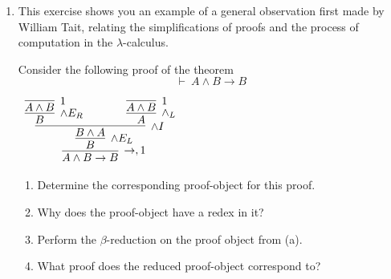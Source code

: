 \documentclass[11pt]{report}
\begin{document}
\begin{enumerate}
	\newpage
		{\bf Extras:} For these extra problems consider $\bot$ to be type with no constructor or destructors. Furthermore, consider $\lnot P$ to be shorthand for the function type: $\lnot P:= P \to \bot$.

		\begin{enumerate}
			\item $p : \lnot A + \lnot B \vdash \ ? : \lnot( A \times  B)$
			\item $p : \lnot( A +  B) \vdash \ ? : \lnot  A \times \lnot  B$
			\item $p : \lnot  A \times \lnot  B \vdash \ ? : \lnot( A + B)$
			\item $f : A \to  C,\ g : B \to  D, \ p : \neg C + \neg  D \vdash \ ? :  \neg A + \neg  B$
			\item $ a : A, \ f : \neg  A \vdash \ ? : \neg  B$
			\item $f : A\rightarrow B, \ g : A \rightarrow \lnot B \vdash \ ? : \lnot  A$
		\end{enumerate}

		{\bf Solutions:} Use the natural deductions from Tutorial 2 to help write these programs :) 

	\newpage
	\item This exercise shows you an example of a general observation first made by William Tait, relating the simplifications of proofs and the process of computation in the $\lambda$-calculus. 
	
	Consider the following proof of the theorem $$\vdash \ A \land B \to B$$
	
	\begin{center}
		$\begin{array}{c}		
		  \infer[\to, 1]{A \land B \to B}
		  	{\infer[\land E_{L}]{B}
				{\infer[\land I]{B \land A}
					{\infer[\land E_{R}]{B}{\infer[1]{A \land B}{}} 
					\hspace{0.5cm}	&	\hspace{0.5cm}
					\infer[\land_{L}]{A}{\infer[1]{A \land B}{}}}}}
		\end{array}$
	  \end{center}

	  	\begin{enumerate}
			\item Determine the corresponding proof-object for this proof. 
			\item Why does the proof-object have a redex in it? 
			\item Perform the $\beta$-reduction on the proof object from (a).
			\item What proof does the reduced proof-object correspond to?
		\end{enumerate}


\end{enumerate}
\end{document}
